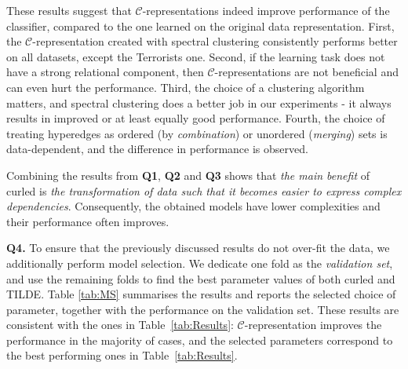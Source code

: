 These results suggest that $\mathcal{C}$-representations indeed improve performance of the classifier, compared to the one learned on the original data representation.
First, the $\mathcal{C}$-representation created with spectral clustering consistently performs better on all datasets, except the Terrorists one.
Second, if the learning  task does not have a strong relational component, then $\mathcal{C}$-representations are not beneficial and can even hurt the performance.
Third, the choice of a clustering algorithm matters, and spectral clustering does a better job in our experiments - it always results in improved or at least equally good performance.
Fourth, the choice of treating hyperedges as ordered (by \textit{combination}) or unordered (\textit{merging}) sets is data-dependent, and the difference in performance is observed.


Combining the results from \textbf{Q1}, \textbf{Q2} and \textbf{Q3} shows that \textit{the main benefit} of \gls{curled} is \textit{the transformation of data such that it becomes easier to express complex dependencies}.
Consequently, the obtained models have lower complexities and  their performance often improves.


\textbf{Q4.} To ensure that the previously discussed results do not over-fit the data, we additionally perform model selection.
We dedicate one fold as the \textit{validation set}, and use the remaining folds to find the best parameter values of both \gls{curled} and TILDE.
Table \ref{tab:MS} summarises the results and reports the selected choice of parameter, together with the performance on the validation set.
These results are consistent with the ones in Table~\ref{tab:Results}: $\mathcal{C}$-representation improves the performance in the majority of cases, and the selected parameters correspond to the best performing ones in Table~\ref{tab:Results}.

